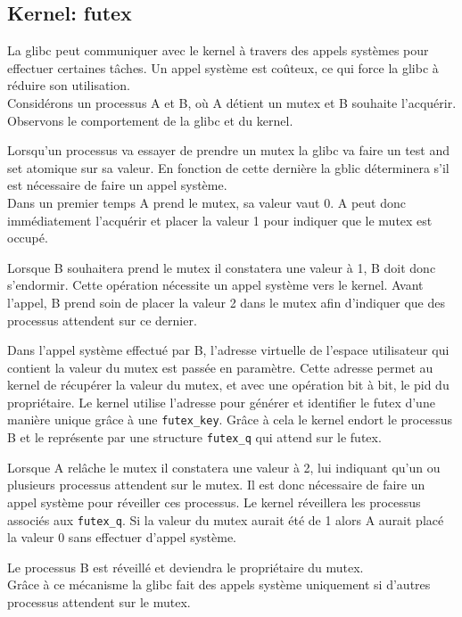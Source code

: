 \subsection{Kernel: futex}

La glibc peut communiquer avec le kernel à travers des appels systèmes pour effectuer certaines tâches.
Un appel système est coûteux, ce qui force la glibc à réduire son utilisation.
\\

Considérons un processus A et B, où A détient un mutex et B souhaite l'acquérir. 
Observons le comportement de la glibc et du kernel.

Lorsqu'un processus va essayer de prendre un mutex la glibc va faire un test and set atomique sur sa valeur. 
En fonction de cette dernière la gblic déterminera s'il est nécessaire de faire un appel système. 
\\

Dans un premier temps A prend le mutex, sa valeur vaut 0. A peut donc immédiatement l'acquérir et placer
la valeur 1 pour indiquer que le mutex est occupé.

Lorsque B souhaitera prend le mutex il constatera une valeur à 1, B doit donc s'endormir. Cette opération
nécessite un appel système vers le kernel. Avant l'appel, B prend soin de placer la valeur 2 dans le mutex
afin d'indiquer que des processus attendent sur ce dernier.

Dans l'appel système effectué par B, l'adresse virtuelle de l'espace utilisateur qui contient
la valeur du mutex est passée en paramètre. Cette adresse permet au kernel de récupérer la valeur du mutex, et avec une opération bit à bit, le pid du propriétaire. 
Le kernel utilise l'adresse pour générer et identifier le futex d'une manière unique grâce à une \verb|futex_key|.
Grâce à cela le kernel endort le processus B et le représente par une structure \verb|futex_q| qui attend sur le futex.

Lorsque A relâche le mutex il constatera une valeur à 2, lui indiquant qu'un ou plusieurs processus
attendent sur le mutex. Il est donc nécessaire de faire un appel système pour réveiller ces processus.
Le kernel réveillera les processus associés aux \verb|futex_q|.
Si la valeur du mutex aurait été de 1 alors A aurait placé la valeur 0 sans effectuer d'appel système.

Le processus B est réveillé et deviendra le propriétaire du mutex.
\\

Grâce à ce mécanisme la glibc fait des appels système uniquement si d'autres processus
attendent sur le mutex.

